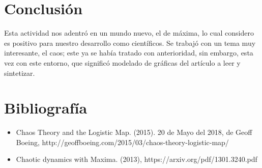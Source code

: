 \documentclass{article}
\begin{document}
\section{Conclusión}
Esta actividad nos adentró en un mundo nuevo, el de máxima, lo cual considero es positivo para nuestro desarrollo como científicos.
Se trabajó con un tema muy interesante, el caos; este ya se había tratado con anterioridad, sin embargo, esta vez con este entorno, que significó modelado de gráficas del artículo a leer y sintetizar.

\section{Bibliografía}
\begin{itemize}
\item Chaos Theory and the Logistic Map. (2015). 20 de Mayo del 2018, de Geoff Boeing, http://geoffboeing.com/2015/03/chaos-theory-logistic-map/
\item Chaotic dynamics with Maxima. (2013),  https://arxiv.org/pdf/1301.3240.pdf
\end{itemize}
\end{document}

